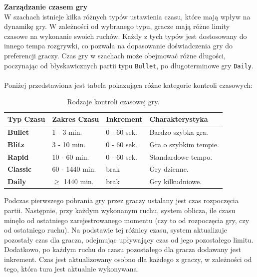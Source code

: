\documentclass[twoside]{projektInzynierskiMS1}
\begin{document}
\noindent \textbf{Zarządzanie czasem gry}\\
W szachach istnieje kilka różnych typów ustawienia czasu, które mają wpływ na dynamikę gry. W zależności od wybranego typu, gracze mają różne limity czasowe na wykonanie swoich ruchów. Każdy z tych typów jest dostosowany do innego tempa rozgrywki, co pozwala na dopasowanie doświadczenia gry do preferencji graczy. Czas gry w szachach może obejmować różne długości, poczynając od błyskawicznych partii typu \texttt{Bullet}, po długoterminowe gry \texttt{Daily}.
\\\\
Poniżej przedstawiona jest tabela pokazująca różne kategorie kontroli czasowych:

\renewcommand{\arraystretch}{1.2}
\begin{table}[h!]
    \centering
    \begin{tabular}{|l|m{3cm}|m{3cm}|m{5cm}|}
        \hline
        \rowcolor{lightgray}
        \textbf{Typ Czasu} & \textbf{Zakres Czasu} & \textbf{Inkrement} & \textbf{Charakterystyka} \\ \hline
        \textbf{Bullet} & 1 - 3 min. & 0 - 60 sek. & Bardzo szybka gra. \\ \hline
        \textbf{Blitz} & 3 - 10 min. & 0 - 60 sek. & Gra o szybkim tempie. \\ \hline
        \textbf{Rapid} & 10 - 60 min. & 0 - 60 sek. & Standardowe tempo. \\ \hline
        \textbf{Classic} & 60 - 1440 min. & brak & Gry dzienne. \\ \hline
        \textbf{Daily} & $\geq$ 1440 min. & brak & Gry kilkudniowe. \\ \hline
    \end{tabular}
    \caption{Rodzaje kontroli czasowej gry.}
\end{table}
\vspace{0.5cm}

\noindent
Podczas pierwszego pobrania gry przez graczy ustalany jest czas rozpoczęcia partii. Następnie, przy każdym wykonanym ruchu, system oblicza, ile czasu minęło od ostatniego zarejestrowanego momentu (czy to od rozpoczęcia gry, czy od ostatniego ruchu). Na podstawie tej różnicy czasu, system aktualizuje pozostały czas dla gracza, odejmując upływający czas od jego pozostałego limitu. Dodatkowo, po każdym ruchu do czasu pozostałego dla gracza dodawany jest inkrement. Czas jest aktualizowany osobno dla każdego z graczy, w zależności od tego, która tura jest aktualnie wykonywana.
\end{document}
